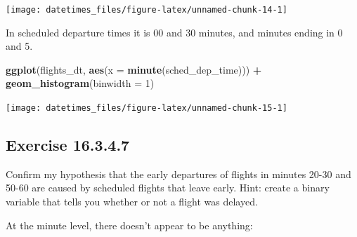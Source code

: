 \documentclass[]{book}
\newenvironment{Shaded}{\begin{snugshade}}{\end{snugshade}}
\newcommand{\DataTypeTok}[1]{\textcolor[rgb]{0.13,0.29,0.53}{#1}}
\newcommand{\DecValTok}[1]{\textcolor[rgb]{0.00,0.00,0.81}{#1}}
\newcommand{\KeywordTok}[1]{\textcolor[rgb]{0.13,0.29,0.53}{\textbf{#1}}}
\newcommand{\NormalTok}[1]{#1}
\newcommand{\OperatorTok}[1]{\textcolor[rgb]{0.81,0.36,0.00}{\textbf{#1}}}
\newcommand{\StringTok}[1]{\textcolor[rgb]{0.31,0.60,0.02}{#1}}
\theoremstyle{plain}
\theoremstyle{remark}
\begin{document}
\begin{Shaded}
\end{Shaded}

\begin{center}\texttt{[image: datetimes\_files/figure-latex/unnamed-chunk-14-1]} \end{center}

In scheduled departure times it is 00 and 30 minutes, and minutes
ending in 0 and 5.

\begin{Shaded}
\begin{Highlighting}[]
\KeywordTok{ggplot}\NormalTok{(flights_dt, }\KeywordTok{aes}\NormalTok{(}\DataTypeTok{x =} \KeywordTok{minute}\NormalTok{(sched_dep_time))) }\OperatorTok{+}
\StringTok{  }\KeywordTok{geom_histogram}\NormalTok{(}\DataTypeTok{binwidth =} \DecValTok{1}\NormalTok{)}
\end{Highlighting}
\end{Shaded}

\begin{center}\texttt{[image: datetimes\_files/figure-latex/unnamed-chunk-15-1]} \end{center}

\hypertarget{exercise-16.3.4.7}{%
\subsection*{\texorpdfstring{Exercise {16.3.4.7}}{Exercise 16.3.4.7}}\label{exercise-16.3.4.7}}

Confirm my hypothesis that the early departures of flights in minutes 20-30 and 50-60 are caused by scheduled flights that leave early. Hint: create a binary variable that tells you whether or not a flight was delayed.

At the minute level, there doesn't appear to be anything:
\end{document}
